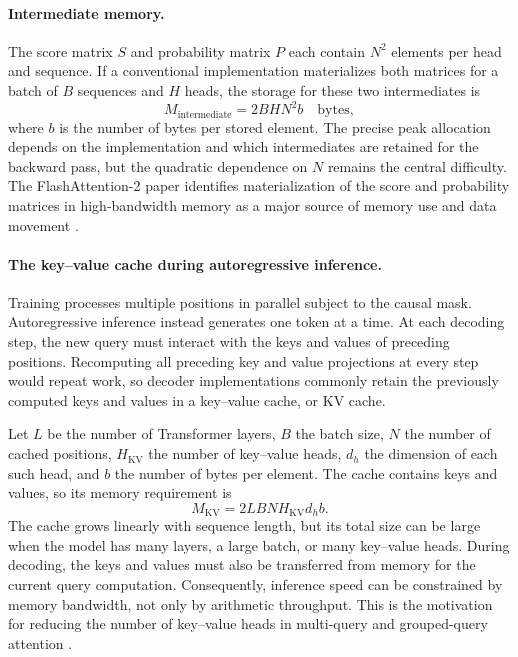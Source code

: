 \paragraph{Intermediate memory.}
The score matrix \(S\) and probability matrix \(P\) each contain \(N^2\)
elements per head and sequence. If a conventional implementation
materializes both matrices for a batch of \(B\) sequences and \(H\) heads,
the storage for these two intermediates is
\begin{equation}
    M_{\mathrm{intermediate}}
    =
    2BHN^2b
    \quad\text{bytes},
    \label{eq:attn-intermediate-memory}
\end{equation}
where \(b\) is the number of bytes per stored element. The precise peak
allocation depends on the implementation and which intermediates are
retained for the backward pass, but the quadratic dependence on \(N\)
remains the central difficulty. The FlashAttention-2 paper identifies
materialization of the score and probability matrices in high-bandwidth
memory as a major source of memory use and data movement
\parencite{dao2023flashattention2}.

\paragraph{The key--value cache during autoregressive inference.}
Training processes multiple positions in parallel subject to the causal
mask. Autoregressive inference instead generates one token at a time.
At each decoding step, the new query must interact with the keys and
values of preceding positions. Recomputing all preceding key and value
projections at every step would repeat work, so decoder implementations
commonly retain the previously computed keys and values in a
key--value cache, or KV cache.

Let \(L\) be the number of Transformer layers, \(B\) the batch size,
\(N\) the number of cached positions, \(H_{\mathrm{KV}}\) the number of
key--value heads, \(d_h\) the dimension of each such head, and \(b\) the
number of bytes per element. The cache contains keys and values, so its
memory requirement is
\begin{equation}
    \boxed{
    M_{\mathrm{KV}}
    =
    2LBNH_{\mathrm{KV}}d_hb
    }.
    \label{eq:attn-kv-cache-memory}
\end{equation}
The cache grows linearly with sequence length, but its total size can be
large when the model has many layers, a large batch, or many key--value
heads. During decoding, the keys and values must also be transferred from
memory for the current query computation. Consequently, inference speed
can be constrained by memory bandwidth, not only by arithmetic throughput.
This is the motivation for reducing the number of key--value heads in
multi-query and grouped-query attention
\parencite{ainslie2023gqa}.

